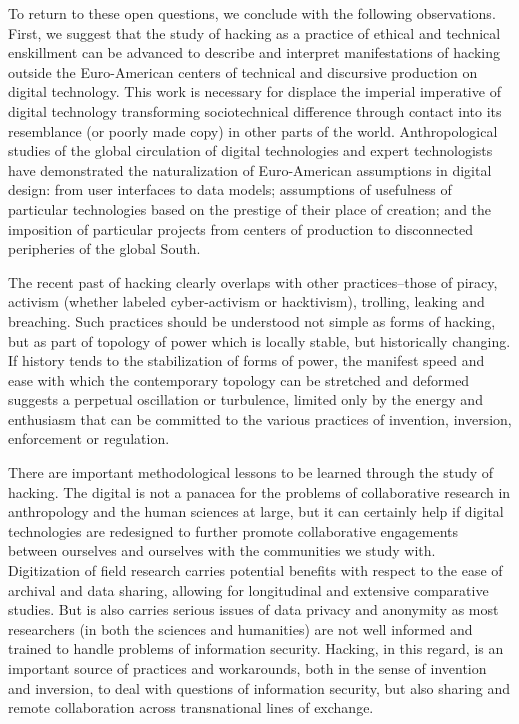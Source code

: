 \documentclass[10pt,letter,oneside]{scrartcl}
\begin{document}
To return to these open questions, we conclude with the following observations.
First, we suggest that the study of hacking as a practice of ethical and technical
enskillment can be advanced to describe and interpret manifestations of hacking 
outside the Euro-American centers of technical and discursive production on digital technology.  This work is necessary for displace the imperial imperative of digital technology transforming sociotechnical difference through contact into its 
resemblance (or poorly made copy) in other parts of the world.  Anthropological 
studies of the global circulation of digital technologies and expert technologists 
have demonstrated the naturalization of Euro-American assumptions in digital design: 
from user interfaces to data models; assumptions of usefulness of particular 
technologies based on the prestige of their place of creation; and the
imposition of particular projects from centers of production to disconnected
peripheries of the global South\cite{chan_networking_2013,takhteyev_coding_2012,xiang_2007}.

The recent past of hacking clearly overlaps with other practices--those of 
piracy, activism (whether labeled cyber-activism or hacktivism), trolling, 
leaking and breaching.  Such practices should be understood not simple as 
forms of hacking, but as part of topology of power which is locally stable, 
but historically changing.  If history tends to the stabilization of forms 
of power, the manifest speed and ease with which the contemporary topology 
can be stretched and deformed suggests a perpetual oscillation or turbulence, 
limited only by the energy and enthusiasm that can be committed to the various 
practices of invention, inversion, enforcement or regulation.

There are important methodological lessons to be learned through the study of
hacking. The digital is not a panacea for the problems of collaborative research 
in anthropology and the human sciences at large, but it can certainly help if 
digital technologies are redesigned to further promote collaborative engagements 
between ourselves and ourselves with the communities we study with. Digitization 
of field research carries potential benefits with respect to the ease of archival 
and data sharing, allowing for longitudinal and extensive comparative studies. 
But is also carries serious issues of data privacy and anonymity as most 
researchers (in both the sciences and humanities) are not well informed and 
trained to handle problems of information security.  Hacking, in this regard, 
is an important source of practices and workarounds, both in the sense of 
invention and inversion, to deal with questions of information security, but 
also sharing and remote collaboration across transnational lines of exchange.
\end{document}
